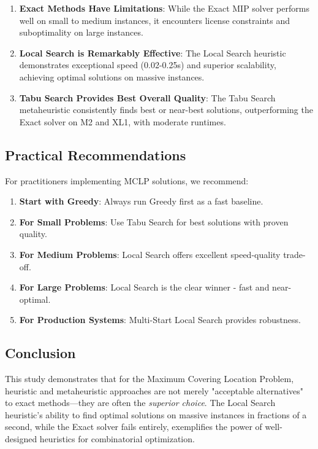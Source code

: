 \documentclass[11pt,a4paper]{article}
\begin{document}
\begin{enumerate}
  \item \textbf{Exact Methods Have Limitations}: While the Exact MIP solver performs well on small to medium instances, it encounters license constraints and suboptimality on large instances.
  
  \item \textbf{Local Search is Remarkably Effective}: The Local Search heuristic demonstrates exceptional speed (0.02-0.25s) and superior scalability, achieving optimal solutions on massive instances.
  
  \item \textbf{Tabu Search Provides Best Overall Quality}: The Tabu Search metaheuristic consistently finds best or near-best solutions, outperforming the Exact solver on M2 and XL1, with moderate runtimes.
\end{enumerate}

\subsection{Practical Recommendations}

For practitioners implementing MCLP solutions, we recommend:

\begin{enumerate}
  \item \textbf{Start with Greedy}: Always run Greedy first as a fast baseline.
  \item \textbf{For Small Problems}: Use Tabu Search for best solutions with proven quality.
  \item \textbf{For Medium Problems}: Local Search offers excellent speed-quality trade-off.
  \item \textbf{For Large Problems}: Local Search is the clear winner - fast and near-optimal.
  \item \textbf{For Production Systems}: Multi-Start Local Search provides robustness.
\end{enumerate}

\subsection{Conclusion}

This study demonstrates that for the Maximum Covering Location Problem, heuristic and metaheuristic approaches are not merely "acceptable alternatives" to exact methods—they are often the \textit{superior choice}. The Local Search heuristic's ability to find optimal solutions on massive instances in fractions of a second, while the Exact solver fails entirely, exemplifies the power of well-designed heuristics for combinatorial optimization.
\end{document}
